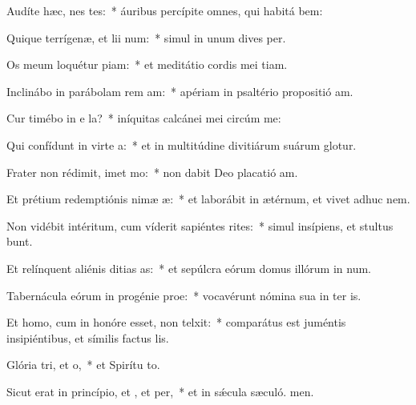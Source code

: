 \item Audíte hæc, nes tes:~* áuribus percípite omnes, qui habitá bem:
\item Quique terrígenæ, et lii num:~* simul in unum dives  per.
\item Os meum loquétur piam:~* et meditátio cordis mei tiam.
\item Inclinábo in parábolam rem am:~* apériam in psaltério propositió am.
\item Cur timébo in e la?~* iníquitas calcánei mei circúm me:
\item Qui confídunt in virte a:~* et in multitúdine divitiárum suárum glotur.
\item Frater non rédimit, imet mo:~* non dabit Deo placatió am.
\item Et prétium redemptiónis nimæ æ:~* et laborábit in ætérnum, et vivet adhuc  nem.
\item Non vidébit intéritum, cum víderit sapiéntes rites:~* simul insípiens, et stultus bunt.
\item Et relínquent aliénis ditias as:~* et sepúlcra eórum domus illórum in num.
\item Tabernácula eórum in progénie  proe:~* vocavérunt nómina sua in ter is.
\item Et homo, cum in honóre esset, non telxit:~* comparátus est juméntis insipiéntibus, et símilis factus  lis.
\item Glória tri, et o,~* et Spirítu to.
\item Sicut erat in princípio, et , et per,~* et in sǽcula sæculó. men.

